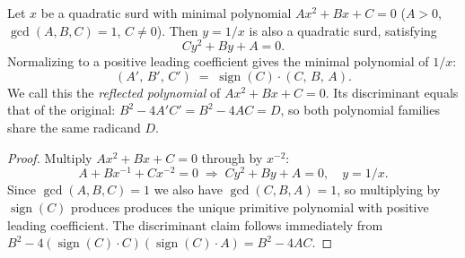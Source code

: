 \begin{lemma}
  \label{lem:reflected-poly}
  Let $x$ be a quadratic surd with minimal polynomial $Ax^2 + Bx + C = 0$
  ($A > 0$, $\gcd(A,B,C) = 1$, $C \neq 0$).  Then $y = 1/x$ is also a quadratic surd,
  satisfying
  \[
    Cy^2 + By + A = 0.
  \]
  Normalizing to a positive leading coefficient gives the minimal polynomial of $1/x$:
  \[
    (A',\, B',\, C') \;=\; \operatorname{sign}(C)\cdot(C,\, B,\, A).
  \]
  We call this the \emph{reflected polynomial} of $Ax^2 + Bx + C = 0$.
  Its discriminant equals that of the original: $B^2 - 4A'C' = B^2 - 4AC = D$, so
  both polynomial families share the same radicand $D$.
\end{lemma}

\begin{proof}
  Multiply $Ax^2 + Bx + C = 0$ through by $x^{-2}$:
  \[
    A + Bx^{-1} + Cx^{-2} = 0
    \;\Longrightarrow\;
    Cy^2 + By + A = 0, \quad y = 1/x.
  \]
  Since $\gcd(A,B,C) = 1$ we also have $\gcd(C,B,A) = 1$, so multiplying by
  $\operatorname{sign}(C)$ produces produces the unique primitive polynomial with positive leading coefficient.
  The discriminant claim follows immediately from $B^2 - 4(\operatorname{sign}(C)\cdot C)
  (\operatorname{sign}(C)\cdot A) = B^2 - 4AC$.
\end{proof}

